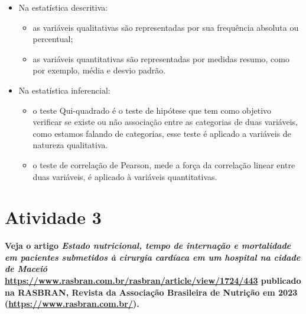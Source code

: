 \documentclass[
]{book}
\begin{document}
\begin{itemize}
\item
  Na estatística descritiva:

  \begin{itemize}
  \item
    as variáveis qualitativas são representadas por sua frequência absoluta ou percentual;
  \item
    as variáveis quantitativas são representadas por medidas resumo, como por exemplo, média e desvio padrão.
  \end{itemize}
\item
  Na estatística inferencial:

  \begin{itemize}
  \item
    o teste Qui-quadrado é o teste de hipótese que tem como objetivo verificar se existe ou não associação entre as categorias de duas variáveis, como estamos falando de categorias, esse teste é aplicado a variáveis de natureza qualitativa.
  \item
    o teste de correlação de Pearson, mede a força da correlação linear entre duas variáveis, é aplicado à variáveis quantitativas.
  \end{itemize}
\end{itemize}

\section{Atividade 3}\label{atividade-3}

\textbf{Veja o artigo \emph{Estado nutricional, tempo de internação e mortalidade em pacientes submetidos à cirurgia cardíaca em um hospital na cidade de Maceió} \url{https://www.rasbran.com.br/rasbran/article/view/1724/443} publicado na RASBRAN, Revista da Associação Brasileira de Nutrição em 2023 (\url{https://www.rasbran.com.br/}).}
\end{document}
